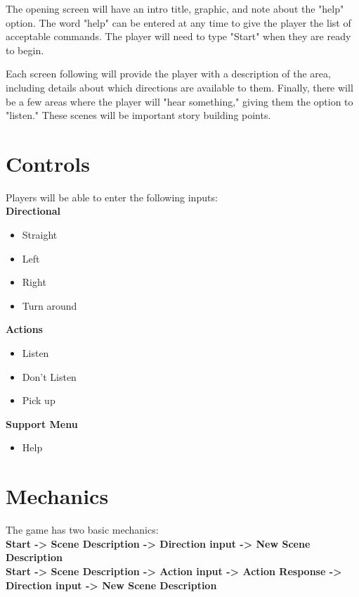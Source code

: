 \documentclass[letterpaper, twoside, 12pt]{memoir}
\begin{document}
The opening screen will have an intro title, graphic, and note about the "help" option. The word "help" can be entered at any time to give the player the list of acceptable commands. The player will need to type "Start" when they are ready to begin. 

Each screen following will provide the player with a description of the area, including details about which directions are available to them. Finally, there will be a few areas where the player will "hear something," giving them the option to "listen." These scenes will be important story building points. 

\section{Controls}

Players will be able to enter the following inputs:
\\

\textbf{Directional}
\begin{itemize}
	\item Straight
	\item Left
	\item Right
	\item Turn around \\
\end{itemize} 

\textbf{Actions}
\begin{itemize}
	\item Listen
	\item Don't Listen
	\item Pick up \\
\end{itemize} 

\textbf{Support Menu}
\begin{itemize}
	\item Help
\end{itemize}

\section{Mechanics}
The game has two basic mechanics: \\

\textbf{Start -> Scene Description -> Direction input -> New Scene Description} \\

\textbf{Start -> Scene Description -> Action input -> Action Response -> Direction input -> New Scene Description}
\end{document}
